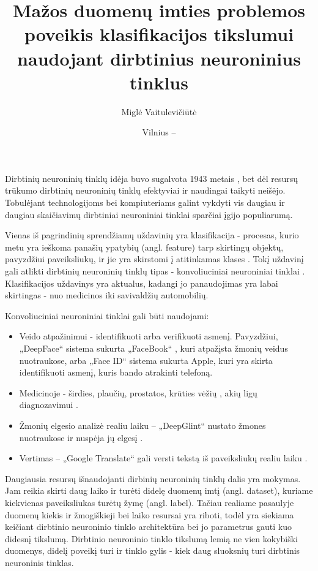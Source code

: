 \documentclass{VUMIFPSkursinis}
\title{Mažos duomenų imties problemos poveikis klasifikacijos tikslumui naudojant dirbtinius neuroninius tinklus}
\author{Miglė Vaitulevičiūtė}
\date{Vilnius – \the\year}
\begin{document}
  
\maketitle
\cleardoublepage{}
\setcounter{page}{2}

\tableofcontents

Dirbtinių neuroninių tinklų idėja buvo sugalvota 1943 metais \cite{firstIdea}, bet dėl resursų trūkumo dirbtinių neuroninių tinklų efektyviai ir naudingai taikyti neišėjo. 
Tobulėjant technologijoms bei kompiuteriams galint vykdyti vis daugiau ir daugiau skaičiavimų dirbtiniai neuroniniai tinklai sparčiai įgijo populiarumą.

Vienas iš pagrindinių sprendžiamų uždavinių yra klasifikacija - procesas, kurio metu yra ieškoma panašių ypatybių (angl. feature) tarp skirtingų objektų, pavyzdžiui paveiksliukų, ir jie yra skirstomi į atitinkamas klases \cite{classificationDef}. Tokį uždavinį gali atlikti dirbtinių neuroninių 
tinklų tipas - konvoliuciniai neuroniniai tinklai \cite{fukushima, LeCun:1999:ORG:646469.691875}. Klasifikacijos uždavinys yra aktualus, kadangi jo panaudojimas yra labai skirtingas - nuo medicinos iki savivaldžių automobilių.

Konvoliuciniai neuroniniai tinklai gali būti naudojami:
\begin{itemize}
\item Veido atpažinimui - identifikuoti arba verifikuoti asmenį. Pavyzdžiui, „DeepFace“ sistema sukurta „FaceBook“ \cite{Taigman:2014:DCG:2679600.2680208}, kuri atpažįsta žmonių veidus nuotraukose, 
arba „Face ID“ sistema sukurta Apple, kuri yra skirta identifikuoti asmenį, kuris bando atrakinti telefoną. 
\item Medicinoje - širdies, plaučių, prostatos, krūties vėžių \cite{cancer}, akių ligų diagnozavimui \cite{eyedis}.
\item Žmonių elgesio analizė realiu laiku – „DeepGlint“ nustato žmones nuotraukose ir nuspėja jų elgesį \cite{deepGlint}.
\item Vertimas – „Google Translate“ gali versti tekstą iš paveiksliukų realiu laiku \cite{Raschka:2015:PML:2886323}.
\end{itemize}

Daugiausia resursų išnaudojanti dirbinių neuroninių tinklų dalis yra mokymas. Jam reikia skirti daug laiko ir turėti didelę duomenų imtį (angl. dataset), kuriame kiekvienas paveiksliukas turėtų žymę (angl. label). Tačiau realiame pasaulyje duomenų kiekis ir žmogiškieji bei laiko resursai yra riboti, 
todėl yra siekiama keičiant dirbtinio neuroninio tinklo architektūra bei jo parametrus gauti kuo didesnį tikslumą. 
Dirbtinio neuroninio tinklo tikslumą lemią ne vien kokybiški duomenys, didelį poveikį turi ir tinklo gylis - kiek daug sluoksnių turi dirbtinis neuroninis 
tinklas. 
\end{document}
